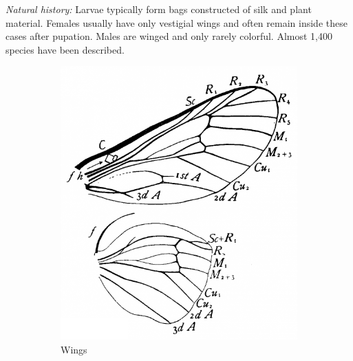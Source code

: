 \documentclass[letterpaper, 11pt]{article}
\begin{document}
\noindent{}\textit{Natural history:} Larvae typically form bags constructed of silk and plant material. Females usually have only vestigial wings and often remain inside these cases after pupation. Males are winged and only rarely colorful. Almost 1,400 species have been described.

\begin{figure}[ht!]
    \centering
    \begin{subfigure}[ht!]{0.36\textwidth}
        \includegraphics[width=\textwidth]{PsychidWings}
        \caption{Wings \citep[Fig. 46]{comstock1918wings}}
        \label{fig:psychid1}
    \end{subfigure}
    \hfill %
    \begin{subfigure}[ht!]{0.13\textwidth}

\end{subfigure}
\end{figure}
\end{document}
